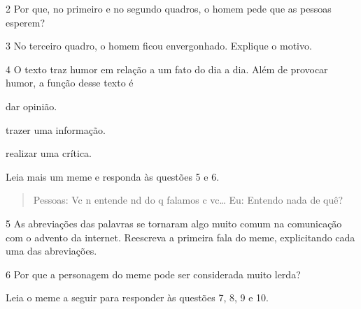 \num{2} Por que, no primeiro e no segundo quadros, o homem pede que as pessoas esperem?


\num{3} No terceiro quadro, o homem ficou envergonhado. Explique o motivo.


\num{4} O texto traz humor em relação a um fato do dia a dia. Além de provocar humor, a função desse texto é

\begin{boxlist}
 dar opinião.

 trazer uma informação.

 realizar uma crítica.
\end{boxlist}

Leia mais um meme e responda às questões 5 e 6.


\begin{quote}
Pessoas: Vc n entende nd do q falamos c vc\ldots{} Eu: Entendo nada de quê?
\end{quote}

\num{5} As abreviações das palavras se tornaram algo muito comum na
  comunicação com o advento da internet. Reescreva a primeira fala do
  meme, explicitando cada uma das abreviações.


\num{6} Por que a personagem do meme pode ser considerada muito lerda?


Leia o meme a seguir para responder às questões 7, 8, 9 e 10.

